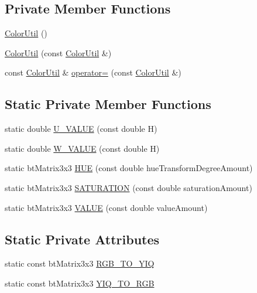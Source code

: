 \subsection*{Private Member Functions}
\begin{DoxyCompactItemize}
\item 
\mbox{\hyperlink{classnjli_1_1_color_util_ae2d34d7e93ee1c81451fe469ea001b5e}{Color\+Util}} ()
\item 
\mbox{\hyperlink{classnjli_1_1_color_util_a53757b38edaf819ee9d92ec6241544f1}{Color\+Util}} (const \mbox{\hyperlink{classnjli_1_1_color_util}{Color\+Util}} \&)
\item 
const \mbox{\hyperlink{classnjli_1_1_color_util}{Color\+Util}} \& \mbox{\hyperlink{classnjli_1_1_color_util_a2e1a337beed33d364c29a4f2140ba215}{operator=}} (const \mbox{\hyperlink{classnjli_1_1_color_util}{Color\+Util}} \&)
\end{DoxyCompactItemize}
\subsection*{Static Private Member Functions}
\begin{DoxyCompactItemize}
\item 
static double \mbox{\hyperlink{classnjli_1_1_color_util_af8c30d8240cec7a999c78faf633f5672}{U\+\_\+\+V\+A\+L\+UE}} (const double H)
\item 
static double \mbox{\hyperlink{classnjli_1_1_color_util_a546dcc4ae049c5b45d9bd20870226768}{W\+\_\+\+V\+A\+L\+UE}} (const double H)
\item 
static bt\+Matrix3x3 \mbox{\hyperlink{classnjli_1_1_color_util_a500118a29045f966fb8c6ed8ea505e49}{H\+UE}} (const double hue\+Transform\+Degree\+Amount)
\item 
static bt\+Matrix3x3 \mbox{\hyperlink{classnjli_1_1_color_util_ad4d4feb55fb385c1720dbae9ae5a0d20}{S\+A\+T\+U\+R\+A\+T\+I\+ON}} (const double saturation\+Amount)
\item 
static bt\+Matrix3x3 \mbox{\hyperlink{classnjli_1_1_color_util_a683449ea8eec905409c9b746858cf14d}{V\+A\+L\+UE}} (const double value\+Amount)
\end{DoxyCompactItemize}
\subsection*{Static Private Attributes}
\begin{DoxyCompactItemize}
\item 
static const bt\+Matrix3x3 \mbox{\hyperlink{classnjli_1_1_color_util_ae8aa4830ab0c084398eb830628323217}{R\+G\+B\+\_\+\+T\+O\+\_\+\+Y\+IQ}}
\item 
static const bt\+Matrix3x3 \mbox{\hyperlink{classnjli_1_1_color_util_a9b3a5642a95a4cf7fbc782ac56acba4f}{Y\+I\+Q\+\_\+\+T\+O\+\_\+\+R\+GB}}
\end{DoxyCompactItemize}


